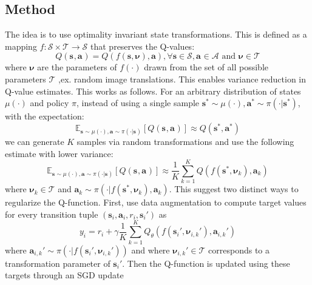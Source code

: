 \documentclass{article}
\begin{document}
\subsection{Method}
The idea is to use optimality invariant state transformations.
This is defined
as a mapping
$ f : \mathcal{S} \times \mathcal{T} \to \mathcal{S}  $ 
that preserves the Q-values:
\begin{equation}
		Q (\bm{s}_{}, \bm{a}_{} ) = Q (f (\bm{s}, \bm{\nu}), \bm{a} ), \forall \bm{s} \in \mathcal{S}, 
		\bm{a}_{} \in \mathcal{A} \text{ and } \bm{\nu} \in \mathcal{T}
\end{equation}
where $ \bm{\nu}  $ are the parameters of $ f (\cdot)  $ drawn from the set
of all possible parameters $ \mathcal{T} $ ,ex.
random image translations.
This enables variance reduction in Q-value estimates.
This works as follows.
For an arbitrary distribution of states $ \mu(\cdot)  $
and policy $ \pi  $, instead of using a single
sample $ \bm{s}_{}^{ * } \sim \mu (\cdot), 
\bm{a}_{}^{ * } \sim \pi (\cdot|\bm{s}_{}^{ * })  $, with the expectation:
\begin{equation}
\mathbb{E}_{ \bm{s}_{} \sim \mu (\cdot), \bm{a}_{} \sim \pi (\cdot|\bm{s}_{}) }
\left[ Q (\bm{s}_{}, \bm{a}_{} ) \right] \approx
Q (\bm{s}_{}^{ * }, \bm{a}_{}^{ * } )
\end{equation}
we can generate $ K  $ samples via random transformations and use the 
following estimate with lower variance:
\begin{equation}
\mathbb{E}_{ \bm{s}_{} \sim \mu (\cdot), \bm{a}_{} \sim \pi (\cdot|\bm{s}_{}) }
\left[ Q (\bm{s}_{}, \bm{a}_{} ) \right]  \approx
\frac{1}{K} \sum_{k=1}^{K} Q (f (\bm{s}_{}^{ * }, \bm{\nu}_{k}), \bm{a}_{k})
\end{equation}
where $ \bm{\nu}_{k} \in \mathcal{T}  $ and
$ \bm{a}_{k} \sim \pi (\cdot |f (\bm{s}_{}^{ * }, \bm{\nu}_{k}), \bm{a}_{k} )  $.
This suggest two distinct ways to regularize the Q-function.
First, use data augmentation to compute target values for every transition tuple
$ \left( \bm{s}_{i}, \bm{a}_{i}, r_{ i }, \bm{s}_{i}' \right)   $ as
\begin{equation}
		\label{eq-aug-batch-sample}
y_{ i } = r_{ i } + \gamma \frac{1}{K}  \sum_{k=1}^{K} 
Q_{ \theta } (f (\bm{s}_{i}', \bm{\nu}_{i,k}'), \bm{a}_{i,k}')
\end{equation}
where $ \bm{a}_{i,k}' \sim \pi (\cdot | f (\bm{s}_{i}', \bm{\nu}_{i,k}'))  $ and
where $ \bm{\nu}_{i,k}' \in \mathcal{T} $ corresponds
to a transformation parameter of $ \bm{s}_{i}'  $.
Then the Q-function is updated using these targets through an SGD update
\end{document}
